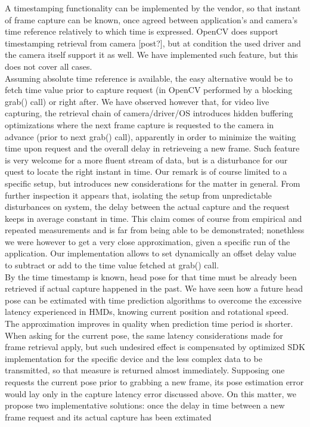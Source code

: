 A timestamping functionality can be implemented by the vendor, so that instant of frame capture can be known, once agreed between application’s and camera’s time reference relatively to which time is expressed. OpenCV does support timestamping retrieval from camera [post?], but at condition the used driver and the camera itself support it as well. We have implemented such feature, but this does not cover all cases.\\
Assuming absolute time reference is available, the easy alternative would be to fetch time value prior to capture request (in OpenCV performed by a blocking grab() call) or right after. We have observed however that, for video live capturing, the retrieval chain of camera/driver/OS introduces hidden buffering optimizations where the next frame capture is requested to the camera in advance (prior to next grab() call), apparently in order to minimize the waiting time upon request and the overall delay in retrieveing a new frame. Such feature is very welcome for a more fluent stream of data, but is a disturbance for our quest to locate the right instant in time. Our remark is of course limited to a specific setup, but introduces new considerations for the matter in general. From further inspection it appears that, isolating the setup from unpredictable disturbances on system, the delay between the actual capture and the request keeps in average constant in time. This claim comes of course from empirical and repeated measurements and is far from being able to be demonstrated; nonethless we were however to get a very close approximation, given a specific run of the application. Our implementation allows to set dynamically an offset delay value to subtract or add to the time value fetched at grab() call.\\
By the time timestamp is known, head pose for that time must be already been retrieved if actual capture happened in the past. We have seen how a future head pose can be extimated with time prediction algorithms to overcome the excessive latency experienced in HMDs, knowing current position and rotational speed. The approximation improves in quality when prediction time period is shorter. When asking for the current pose, the same latency considerations made for frame retrieval apply, but such undesired effect is compensated by optimized SDK implementation for the specific device and the less complex data to be transmitted, so that measure is returned almost immediately. Supposing one requests the current pose prior to grabbing a new frame, its pose estimation error would lay only in the capture latency error discussed above. On this matter, we propose two implementative solutions: once the delay in time between a new frame request and its actual capture has been extimated
